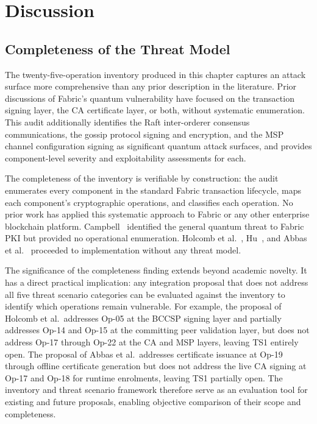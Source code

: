 \documentclass[conference]{IEEEtran}
\begin{document}
\section{Discussion}
\label{sec:tm_discussion}

\subsection{Completeness of the Threat Model}

The twenty-five-operation inventory produced in this chapter captures an
attack surface more comprehensive than any prior description in the
literature. Prior discussions of Fabric's quantum vulnerability have
focused on the transaction signing layer, the CA certificate layer, or
both, without systematic enumeration. This audit additionally identifies
the Raft inter-orderer consensus communications, the gossip protocol
signing and encryption, and the MSP channel configuration signing as
significant quantum attack surfaces, and provides component-level severity
and exploitability assessments for each.

The completeness of the inventory is verifiable by construction: the audit
enumerates every component in the standard Fabric transaction lifecycle,
maps each component's cryptographic operations, and classifies each
operation. No prior work has applied this systematic approach to Fabric
or any other enterprise blockchain platform. Campbell~\cite{campbell2019}
identified the general quantum threat to Fabric PKI but provided no
operational enumeration. Holcomb et al.~\cite{holcomb2021}, Hu~\cite{hu2025prototype},
and Abbas et al.~\cite{abbas2025} proceeded to implementation without
any threat model.

The significance of the completeness finding extends beyond academic
novelty. It has a direct practical implication: any integration proposal
that does not address all five threat scenario categories can be
evaluated against the inventory to identify which operations remain
vulnerable. For example, the proposal of Holcomb et al.\ addresses Op-05
at the BCCSP signing layer and partially addresses Op-14 and Op-15 at
the committing peer validation layer, but does not address Op-17 through
Op-22 at the CA and MSP layers, leaving TS1 entirely open. The proposal
of Abbas et al.\ addresses certificate issuance at Op-19 through offline
certificate generation but does not address the live CA signing at Op-17
and Op-18 for runtime enrolments, leaving TS1 partially open. The
inventory and threat scenario framework therefore serve as an evaluation
tool for existing and future proposals, enabling objective comparison
of their scope and completeness.
\end{document}
